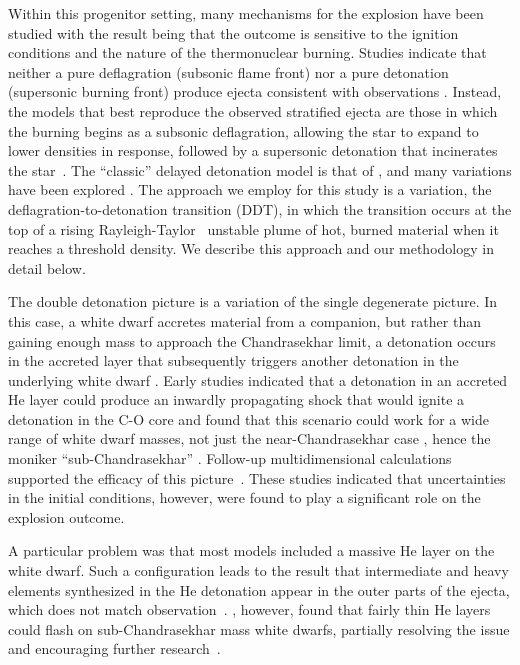 \documentclass[preprint2]{aastex63}
\begin{document}
Within this progenitor setting, many mechanisms for the explosion have
been studied with the result being that the outcome is sensitive to
the ignition conditions and the nature of the thermonuclear burning.
Studies indicate that neither a pure deflagration (subsonic flame front)
nor a pure detonation (supersonic burning front) produce ejecta consistent
with observations \citep{arnett69,roepkeetal07}.  Instead, the models
that best reproduce the observed stratified ejecta are those in which
the burning begins as a subsonic deflagration, allowing the star
to expand to lower densities in response, followed by a
supersonic detonation that incinerates the
star~\citep{Nomo84,Khokhlov1991Delayed-detonat,HoefKhok96,GameKhokOran05}.
The ``classic'' delayed detonation model is that of
\citet{Khokhlov1991Delayed-detonat} \citep[See also][]{hoflich.khokhlov.ea:delayed,GameKhokOran05},
and many variations have been
explored \citep[and references therein]{hillebrandtetal2013,calderetal2013}.
The approach we employ for this study is a variation, the
deflagration-to-detonation transition (DDT), in which the transition
occurs at the top of a rising Rayleigh-Taylor~\citep{taylor+50,chandra+81}
unstable plume of hot, burned
material when it reaches a threshold density.
We describe this approach and our methodology in detail below.

The double detonation picture is a variation of the single degenerate picture.
In this case, a white dwarf accretes material from a companion, but rather
than gaining enough mass to approach the Chandrasekhar limit, a detonation
occurs in the accreted layer that subsequently triggers another detonation
in the underlying white dwarf \citep{woosleyweavertaam80,taam80a,taam80b,
nomoto80,nomoto82b}. Early studies indicated that a detonation in an
accreted He
layer could produce an inwardly propagating
shock that would ignite a detonation in the C-O core and found
that this scenario could work for a wide range of white dwarf
masses, not just the near-Chandrasekhar case \citep{livne90}, hence the
moniker ``sub-Chandrasekhar'' \citep{ww94}.
Follow-up multidimensional calculations
supported the
efficacy of this picture~\citep{livneglasner91, livnearnett95,HoefKhok96,
hoeflichetal96, wigginsfalle97,wigginsetal98,garciasenzbravowoosley99}.
These studies indicated that uncertainties in the initial conditions,
however, were found to play a significant role on the explosion outcome.

A particular problem was that most models included a massive He layer on
the white dwarf. Such a configuration leads to the result that
intermediate and heavy elements synthesized in the He detonation appear in
the outer parts of the ejecta, which does not match observation~\citep{HoefKhok96,
hoeflichetal96,finkhillebrandtroepke2007,simetal2010}.  \citet{bildstenetal2007},
however, found that fairly thin He layers could flash on sub-Chandrasekhar
mass white dwarfs, partially resolving the issue and encouraging
further research~\citep{simetal2012,brooksetal2015, shenetal2018,
glasneretal2018,Townsleyetal2019}.
\end{document}
